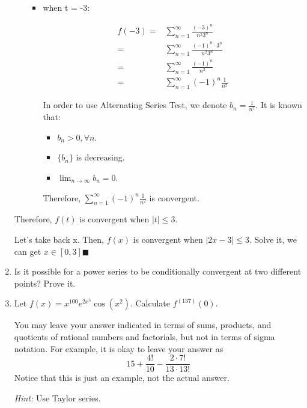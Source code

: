 \documentclass[12pt]{exam}
\newcommand {\DS} [1] {${\displaystyle #1}$}
\begin{document}
\begin{enumerate}
\begin{itemize}
\begin{itemize}
		\item when t = -3:

		\begin{align*}
			f(-3) 
			=& \sum_{n = 1}^{\infty} \frac{(-3)^n}{n^2 3^n} \\
			=& \sum_{n = 1}^{\infty} \frac{(-1)^n\cdot3^n}{n^2 3^n} \\
			=& \sum_{n = 1}^{\infty} \frac{(-1)^n}{n^2} \\
			=& \sum_{n = 1}^{\infty} (-1)^n \frac{1}{n^2}
		\end{align*}

		In order to use Alternating Series Test, we denote $b_n = \frac{1}{n^2}$. It is known that:
		\begin{itemize}
			\item $b_n > 0, \forall n$.
			\item $\{b_n\}$ is decreasing.
			\item $\lim_{n \to \infty} b_n = 0$.
		\end{itemize}

		Therefore, $\sum_{n = 1}^{\infty} (-1)^n \frac{1}{n^2}$ is convergent.
	\end{itemize}
\end{itemize}

Therefore, $f(t)$ is convergent when $|t| \leq 3$.

Let's take back x. Then, $f(x)$ is convergent when $|2x - 3| \leq 3$. Solve it, we can get $x \in [0, 3] \blacksquare$

\newpage

\item Is it possible for a power series to be conditionally convergent at two different points?  Prove it.

\item Let \DS{f(x) = x^{100} e^{2x^5} \cos ( x^2) }.  Calculate \DS{f^{(137)}(0)}.   

You may leave your answer indicated in terms of sums, products, and quotients of rational numbers and factorials, but not in terms of sigma notation.  For example, it is okay to leave your answer as
	$$
		 15 + \frac{4!}{10} - \frac{2 \cdot 7!}{13 \cdot 13!}
	$$ 
Notice that this is just an example, not the actual answer.	

\emph{Hint:}  Use Taylor series.  



\end{enumerate}
\end{document}
